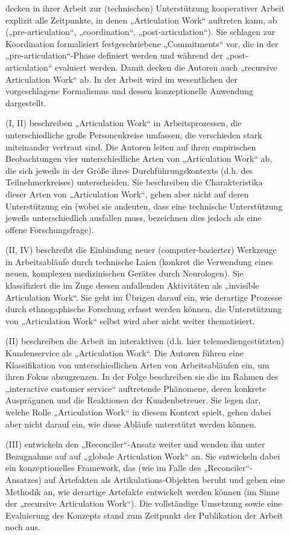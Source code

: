 \begin{description}
	\item[\citet{Raposo04}] decken in ihrer Arbeit zur (technischen) Unterstützung kooperativer Arbeit explizit alle Zeitpunkte, in denen „Articulation Work“ auftreten kann, ab („pre-articulation“, „coordination“, „post-articulation“). Sie schlagen zur Koordination formalisiert festgeschriebene „Commitments“ vor, die in der „pre-articulation“-Phase definiert werden und während der „post-articulation“ evaluiert werden. Damit decken die Autoren auch „recursive Articulation Work“ \citet{Sarini02} ab. In der Arbeit wird im wesentlichen der vorgeschlagene Formalismus und dessen konzeptionelle Anwendung dargestellt.
	\item[\citet{Faergemann05}] (I, II) beschreiben „Articulation Work“ in Arbeitsprozessen, die unterschiedliche große Personenkreise umfassen, die verschieden stark miteinander vertraut sind. Die Autoren leiten auf ihren empirischen Beobachtungen vier unterschiedliche Arten von „Articulation Work“ ab, die sich jeweils in der Größe ihres Durchführungskontexts (d.h. des Teilnehmerkreises) unterscheiden. Sie beschreiben die Charakteristika dieser Arten von „Articulation Work“, gehen aber nicht auf deren Unterstützung ein (wobei sie andeuten, dass eine technische Unterstützung jeweils unterschiedlich ausfallen muss, bezeichnen dies jedoch als eine offene Forschungsfrage).
	\item[\citet{Hasu05}] (II, IV) beschreibt die Einbindung neuer (computer-basierter) Werkzeuge in Arbeitsabläufe durch technische Laien (konkret die Verwendung eines neuen, komplexen medizinischen Gerätes durch Neurologen). Sie klassifiziert die im Zuge dessen anfallenden Aktivitäten als „invisible Articulation Work“. Sie geht im Übrigen darauf ein, wie derartige Prozesse durch ethnogaphische Forschung erfasst werden können, die Unterstützung von „Articulation Work“ selbst wird aber nicht weiter thematisiert.
	\item[\citet{Hampson05}] (II) beschreiben die Arbeit im interaktiven (d.h. hier telemediengestützten) Kundenservice als „Articulation Work“. Die Autoren führen eine Klassifikation von unterschiedlichen Arten von Arbeitsabläufen ein, um ihren Fokus abzugrenzen. In der Folge beschreiben sie die im Rahmen des „interactive customer service“ auftretende Phänomene, deren konkrete Ausprägunen und die Reaktionen der Kundenbetreuer. Sie legen dar, welche Rolle „Articulation Work“ in diesem Kontext spielt, gehen dabei aber nicht darauf ein, wie diese Abläufe unterstützt werden können. 
	\item[\citet{Cabitza06}] (III) entwickeln den „Reconciler“-Ansatz weiter und wenden ihn unter Bezugnahme auf \citet{Faergemann05} auf „globale Articulation Work“ an. Sie entwickeln dabei ein konzeptionelles Framework, das (wie im Falle des „Reconciler“-Ansatzes) auf Artefakten als Artikulations-Objekten beruht und geben eine Methodik an, wie derartige Artefakte entwickelt werden können (im Sinne der „recursive Articulation Work“). Die vollständige Umsetzung sowie eine Evaluierung des Konzepts stand zum Zeitpunkt der Publikation der Arbeit noch aus. 

\end{description}
